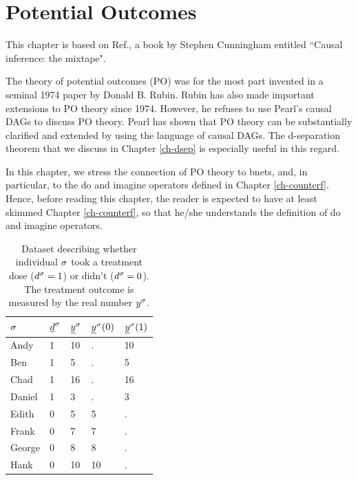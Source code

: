 \chapter{Potential Outcomes}
\label{ch-po}
This chapter
is based on Ref.\cite{book-mixtape},
a book by Stephen Cunningham entitled 
``Causal inference: the mixtape".

The theory of potential
outcomes (PO) was for the most part
invented in a seminal
1974 paper by Donald B. Rubin. Rubin
has also
made important extensions
to PO theory since 1974. However, he refuses to
use Pearl's causal DAGs to discuss PO theory. 
Pearl has shown that PO theory
can be substantially clarified
and extended by using
the language of causal DAGs.
The d-separation theorem 
that we discuss in  Chapter \ref{ch-dsep}
is especially
useful in this regard.


In this chapter, we stress the
connection
of PO theory to bnets,
and, in particular, to 
the do and imagine operators 
defined in Chapter \ref{ch-counterf}. Hence,
before reading this chapter,
the reader is expected to have at least
skimmed  Chapter \ref{ch-counterf},
so that he/she understands
the definition
of do and imagine operators.

\begin{table}[h!]
\centering
\begin{tabular}{|l|l|l|l|l|}
\hline
\rowcolor[HTML]{ECF4FF} 
$\sigma$ & ${\underline{d}}^\sigma$ & ${\underline{y}}^\sigma$ & ${\underline{y}}^\sigma(0)$ & ${\underline{y}}^\sigma(1)$ \\ \hline
Andy & \cellcolor[HTML]{FFFFC7}1 & 10 & . & 10 \\ \hline
Ben & \cellcolor[HTML]{FFFFC7}1 & 5 & . & 5 \\ \hline
Chad & \cellcolor[HTML]{FFFFC7}1 & 16 & . & 16 \\ \hline
Daniel & \cellcolor[HTML]{FFFFC7}1 & 3 & . & 3 \\ \hline
Edith & 0 & 5 & 5 & . \\ \hline
Frank & 0 & 7 & 7 & . \\ \hline
George & 0 & 8 & 8 & . \\ \hline
Hank & 0 & 10 & 10 & . \\ \hline
\end{tabular}
\caption{Dataset describing whether
individual $\sigma$
took a treatment dose ($d^\sigma=1$)
or didn't ($d^\sigma=0$).
The 
treatment outcome
is measured by the real number $y^\sigma$.}
\label{tab-pot-out-missing}
\end{table} 

